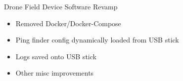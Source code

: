




\begin{frame}{Drone Field Device Software Revamp}
    \begin{itemize}
        \item Removed Docker/Docker-Compose
        \item Ping finder config dynamically loaded from USB stick
        \item Logs saved onto USB stick
        \item Other misc improvements
    \end{itemize}    
\end{frame}

